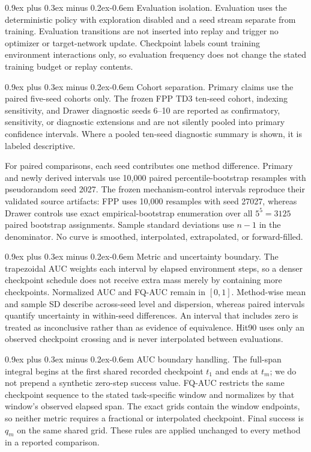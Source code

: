 \documentclass[10pt,letterpaper]{article}
\makeatletter
\renewcommand\paragraph{\@startsection{paragraph}{4}{0pt}%
  {0.9ex plus 0.3ex minus 0.2ex}{-0.6em}%
  {\normalfont\normalsize\bfseries}}
\makeatother
\begin{document}
\paragraph{Evaluation isolation.}
Evaluation uses the deterministic policy with exploration disabled and a
seed stream separate from training. Evaluation transitions are not inserted
into replay and trigger no optimizer or target-network update. Checkpoint
labels count training environment interactions only, so evaluation frequency
does not change the stated training budget or replay contents.

\paragraph{Cohort separation.}
Primary claims use the paired five-seed cohorts only. The frozen FPP TD3
ten-seed cohort, indexing sensitivity, and Drawer diagnostic seeds 6--10 are
reported as confirmatory, sensitivity, or diagnostic extensions and are not
silently pooled into primary confidence intervals. Where a pooled ten-seed
diagnostic summary is shown, it is labeled descriptive.

For paired comparisons, each seed contributes one method difference. Primary
and newly derived intervals use 10,000 paired percentile-bootstrap resamples
with pseudorandom seed 2027. The frozen mechanism-control intervals reproduce
their validated source artifacts: FPP uses 10,000 resamples with seed 27027,
whereas Drawer controls use exact empirical-bootstrap enumeration over all
\(5^5=3125\) paired bootstrap assignments.
Sample standard deviations use \(n-1\) in the denominator. No curve is
smoothed, interpolated, extrapolated, or forward-filled.

\paragraph{Metric and uncertainty boundary.}
The trapezoidal AUC weights each interval by elapsed environment steps, so a
denser checkpoint schedule does not receive extra mass merely by containing
more checkpoints. Normalized AUC and FQ-AUC remain in \([0,1]\). Method-wise
mean and sample SD describe across-seed level and dispersion, whereas paired
intervals quantify uncertainty in within-seed differences. An interval that
includes zero is treated as inconclusive rather than as evidence of
equivalence. Hit90 uses only an observed checkpoint crossing and is never
interpolated between evaluations.

\paragraph{AUC boundary handling.}
The full-span integral begins at the first shared recorded checkpoint \(t_1\)
and ends at \(t_m\); we do not prepend a synthetic zero-step success value.
FQ-AUC restricts the same checkpoint sequence to the stated task-specific
window and normalizes by that window's observed elapsed span. The exact grids
contain the window endpoints, so neither metric requires a fractional or
interpolated checkpoint. Final success is \(q_m\) on the same shared grid.
These rules are applied unchanged to every method in a reported comparison.
\end{document}
